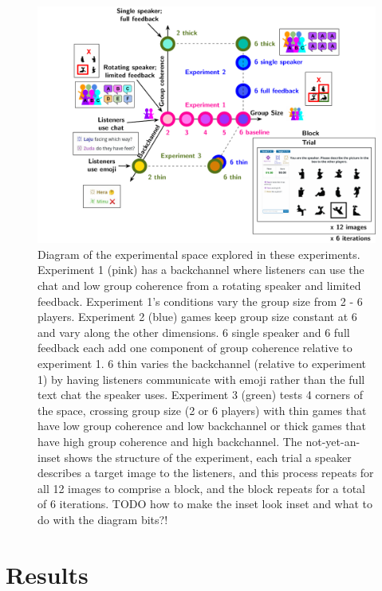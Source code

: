 \documentclass[
  english,
  a4paper,
]{article}
\begin{document}
\begin{figure}[t!]

{\centering \includegraphics[width=1\linewidth]{expt-diagram} 

}

\caption{Diagram of the experimental space explored in these experiments. Experiment 1 (pink) has a backchannel where listeners can use the chat and low group coherence from a rotating speaker and limited feedback. Experiment 1's conditions vary the group size from 2 - 6 players. Experiment 2 (blue) games keep group size constant at 6 and vary along the other dimensions. 6 single speaker and 6 full feedback each add one component of group coherence relative to experiment 1. 6 thin varies the backchannel (relative to experiment 1) by having listeners communicate with emoji rather than the full text chat the speaker uses. Experiment 3 (green) tests 4 corners of the space, crossing group size (2 or 6 players) with thin games that have low group coherence and low backchannel or thick games that have high group coherence and high backchannel.  The not-yet-an-inset shows the structure of the experiment, each trial a speaker describes a target image to the listeners, and this process repeats for all 12 images to comprise a block, and the block repeats for a total of 6 iterations. TODO how to make the inset look inset and what to do with the diagram bits?!}\label{fig:diagram}
\end{figure}

\hypertarget{results}{%
\section{Results}\label{results}}
\end{document}
